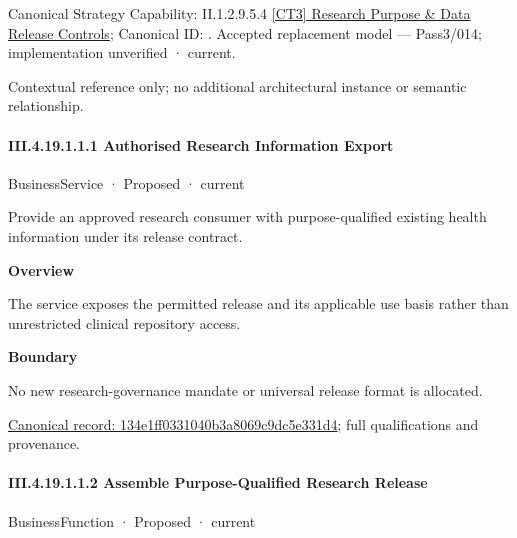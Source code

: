 {\small Canonical Strategy Capability: II.1.2.9.5.4 \hyperref[element:6ca69337ffe1477292944524be0693c9]{[CT3] Research Purpose \& Data Release Controls}; Canonical ID: \texttt{}. Accepted replacement model — Pass3/014; implementation unverified · current.}\par
Contextual reference only; no additional architectural instance or semantic relationship.\par
\paragraph*{III.4.19.1.1.1 Authorised Research Information Export}
\label{navigation:III.4.19.1.1.1}

\label{element:134e1ff0331040b3a8069c9dc5e331d4}
{\small BusinessService · Proposed · current}\par

Provide an approved research consumer with purpose-qualified existing health information under its release contract.



\textbf{Overview}



The service exposes the permitted release and its applicable use basis rather than unrestricted clinical repository access.



\textbf{Boundary}



No new research-governance mandate or universal release format is allocated.


{\footnotesize \href{../../../../../../../../continuum/business/business-service/134e1ff0331040b3a8069c9dc5e331d4.md}{Canonical record: 134e1ff0331040b3a8069c9dc5e331d4}; full qualifications and provenance.}\par
\paragraph*{III.4.19.1.1.2 Assemble Purpose-Qualified Research Release}
\label{navigation:III.4.19.1.1.2}

\label{element:bf4354a421174a9ba56c281f4dcd11f6}
{\small BusinessFunction · Proposed · current}\par

